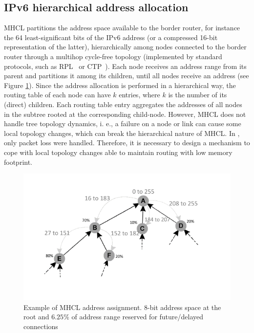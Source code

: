 \subsection{IPv6 hierarchical address allocation}\label{sec:mhcl}

MHCL partitions the address space available to the border router, for instance the 64 least-significant bits of the IPv6 address (or a compressed 16-bit representation of the latter), hierarchically among nodes connected to the border router through a multihop cycle-free topology (implemented by standard protocols, such as RPL~\cite{rfc6550} or CTP~\cite{Fonseca:2009}). Each node
receives an address range from its parent and partitions it among its children, until all nodes receive an address (see Figure \ref{fig:mhcl}). Since the address allocation is performed in a hierarchical way, the routing table of each node can have $k$ entries, where $k$ is the number of its (direct) children. Each routing table entry aggregates the addresses of all nodes in the subtree rooted at the corresponding child-node. However, MHCL does not handle tree topology dynamics, i. e., a failure on a node or link can cause some local topology changes, which can break the hierarchical nature of MHCL. In \cite{mhcl}, only packet loss were handled. Therefore, it is necessary to design a mechanism to cope with local topology changes able to maintain routing with low memory footprint.

\begin{figure}[!ht]
    \centering
    \includegraphics[width=1\linewidth]{./Images/mhcl.pdf}
\caption{Example of MHCL address assignment. 8-bit address space at the root and $6.25\%$ of address range reserved for future/delayed connections}
    \label{fig:mhcl}
\end{figure}

